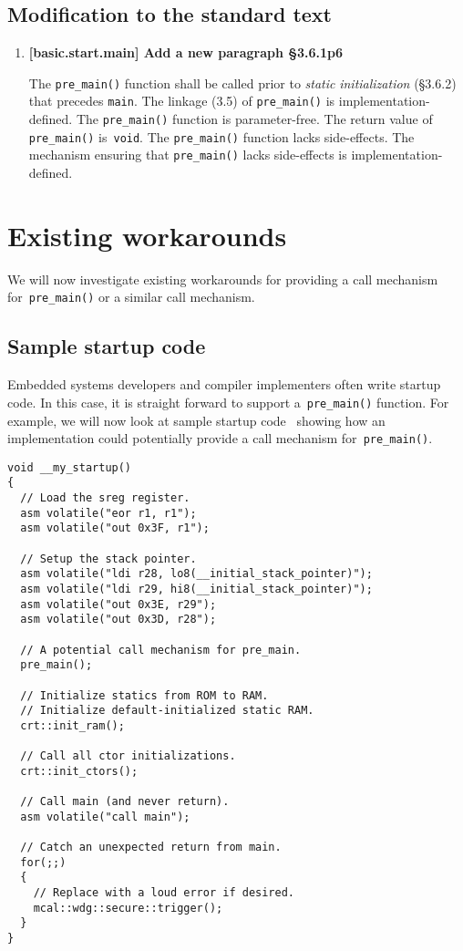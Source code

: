 \documentclass[11pt]{article}
\begin{document}
\subsection*{Modification to the standard text}
\begin{enumerate}

  \item \textbf{[basic.start.main] Add a new paragraph \S3.6.1p6}

  The \lstinline{pre_main()} function shall be called prior to
  \emph{static} \emph{initialization} (\S3.6.2)
  that precedes \lstinline{main}.
  The linkage (3.5) of \lstinline{pre_main()} is implementation-defined.
  The \lstinline{pre_main()} function is parameter-free.
  The return value of \lstinline{pre_main()} is~\lstinline{void}.
  The \lstinline{pre_main()} function lacks side-effects.
  The mechanism ensuring that \lstinline{pre_main()} lacks
  side-effects is implementation-defined.

\end{enumerate}

\section{Existing workarounds}

We will now investigate existing workarounds for providing
a call mechanism for~\lstinline{pre_main()} or a similar
call mechanism.

\subsection*{Sample startup code}

Embedded systems developers and compiler implementers often
write startup code. In this case, it is straight forward
to support a~\lstinline{pre_main()} function.
For example, we will now look at sample startup
code~\cite{bib:kormanyos2013,bib:kormanyosgit2015}
showing how an implementation could potentially provide
a call mechanism for~\lstinline{pre_main()}.
  
\begin{lstlisting}
void __my_startup()
{
  // Load the sreg register.
  asm volatile("eor r1, r1");
  asm volatile("out 0x3F, r1");

  // Setup the stack pointer.
  asm volatile("ldi r28, lo8(__initial_stack_pointer)");
  asm volatile("ldi r29, hi8(__initial_stack_pointer)");
  asm volatile("out 0x3E, r29");
  asm volatile("out 0x3D, r28");

  // A potential call mechanism for pre_main.
  pre_main();

  // Initialize statics from ROM to RAM.
  // Initialize default-initialized static RAM.
  crt::init_ram();

  // Call all ctor initializations.
  crt::init_ctors();

  // Call main (and never return).
  asm volatile("call main");

  // Catch an unexpected return from main.
  for(;;)
  {
    // Replace with a loud error if desired.
    mcal::wdg::secure::trigger();
  }
}
\end{lstlisting}
  
\end{document}
